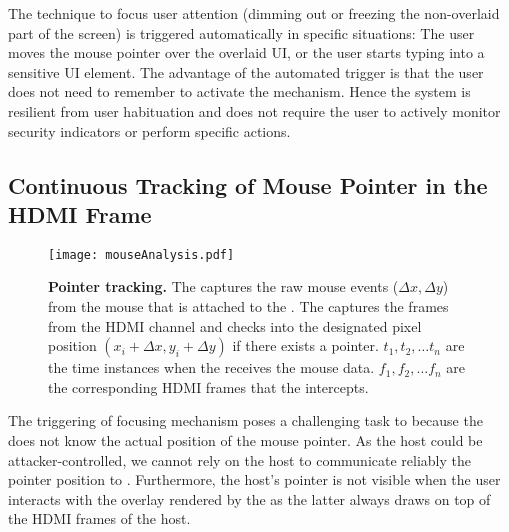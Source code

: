  The technique to focus user attention (dimming out or freezing the non-overlaid part of the screen) is triggered automatically in specific situations: The user moves the mouse pointer over the overlaid UI, or the user starts typing into a sensitive UI element. 
The advantage of the automated trigger is that the user does not need to remember to activate the mechanism. Hence the system is resilient from user habituation and does not require the user to actively monitor security indicators or perform specific actions.

\subsection{Continuous Tracking of Mouse Pointer in the HDMI Frame}
\label{sec:systemDesign:analysis}


\begin{figure}[t]
\centering
\texttt{[image: mouseAnalysis.pdf]}
\caption{\textbf{Pointer tracking.} \one The \device captures the raw mouse events ($\Delta x, \Delta y$) from the mouse that is attached to the \device. \two The \device captures the frames from the HDMI channel and checks into the designated pixel position $(x_i + \Delta x, y_i + \Delta y)$ if there exists a pointer. $t_1, t_2,\ldots t_n$ are the time instances when the \device receives the mouse data. $f_1, f_2,\ldots f_n$ are the corresponding HDMI frames that the \device intercepts.}
\spacesave
\label{fig:mouseAnalysis}
\centering
\end{figure}

The triggering of focusing mechanism poses a challenging task to \name because the \device does not know the actual position of the mouse pointer. As the host could be attacker-controlled, we cannot rely on the host to communicate reliably the pointer position to \device. Furthermore, the host's pointer is not visible when the user interacts with the overlay rendered by the \device as the latter always draws on top of the HDMI frames of the host. 


